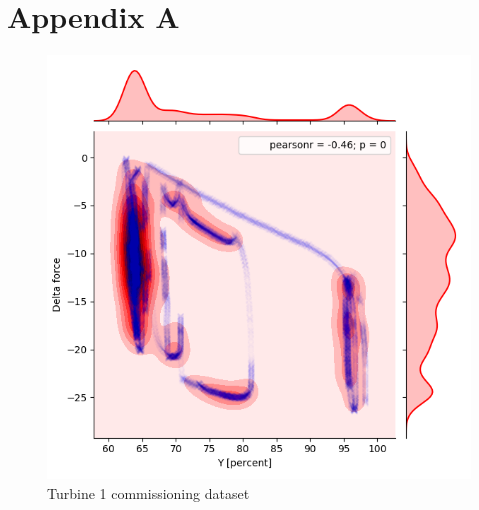 
\appendix
\section{Appendix A}

\cleardoublepage
\begin{figure}[ht] \label{ fig7} 
    \begin{minipage}[b]{0.5\linewidth}
        \includegraphics[width=1\linewidth]{figures/data/kdePlot_noServo_A1.png} 
        \caption{Turbine 1 commissioning dataset } 
    \end{minipage} 
    \begin{minipage}[b]{0.5\linewidth}

\end{minipage}
\end{figure}

